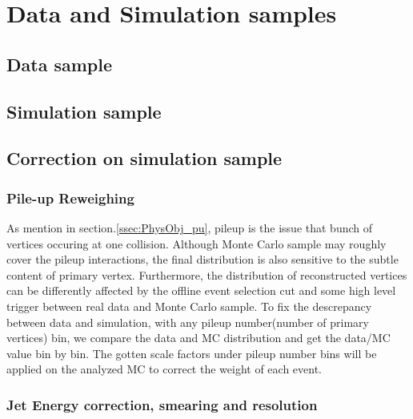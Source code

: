 

\section{Data and Simulation samples}
\label{sec:DataAndMC}

	\subsection{Data sample}
	\label{ssec:DataAndMC_Data}


	\subsection{Simulation sample}
	\label{ssec:DataAndMC_MC}

	\subsection{Correction on simulation sample}
	\label{ssec:DataAndMC_corMC}

		\subsubsection{Pile-up Reweighing}
		\label{sssec:DataAndMC_PU}


			As mention in section.\ref{ssec:PhysObj_pu}, pileup is the issue that bunch of vertices occuring at one collision. Although Monte Carlo sample may roughly cover the pileup interactions, the final distribution is also sensitive to the subtle content of primary vertex. Furthermore, the distribution of reconstructed vertices can be differently affected by the offline event selection cut and some high level trigger between real data and Monte Carlo sample. To fix the descrepancy between data and simulation, with any pileup number(number of primary vertices) bin, we compare the data and MC distribution and get the data/MC value bin by bin. The gotten scale factors under pileup number bins will be applied on the analyzed MC to correct the weight of each event.

		\subsubsection{Jet Energy correction, smearing and resolution}
		\label{sssec:DataAndMC_JE_CSR}

